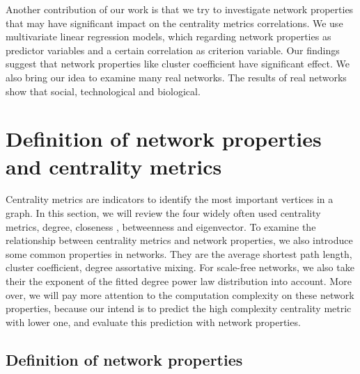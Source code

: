 \documentclass[symmetry,article,submit,moreauthors,pdftex,10pt,a4paper]{Definitions/mdpi}
\begin{document}
Another contribution of our work is that we try to investigate network properties that may have significant impact on the centrality metrics correlations. We use multivariate linear regression models, which regarding network properties as predictor variables  and a certain correlation as criterion variable.  Our findings suggest that network properties like cluster coefficient have significant effect. We also bring our idea to examine many real networks. The results of real networks show that social, technological and biological.


\section{Definition of network properties and centrality metrics}
\label{sec:definition}
Centrality metrics are indicators to identify the most important vertices in a graph. In this section, we will review the four widely often used centrality metrics, degree, closeness , betweenness and eigenvector. To examine the relationship between centrality metrics and network properties, we also introduce some common properties in networks. They are the average shortest path length, cluster coefficient, degree assortative mixing. For scale-free networks, we also take their the exponent of the fitted degree power law distribution into account. More over, we will pay more attention to the computation complexity on these network properties, because our intend is to predict the high complexity centrality metric with lower one, and evaluate this prediction with network properties.

\subsection{Definition of network properties}
\end{document}
